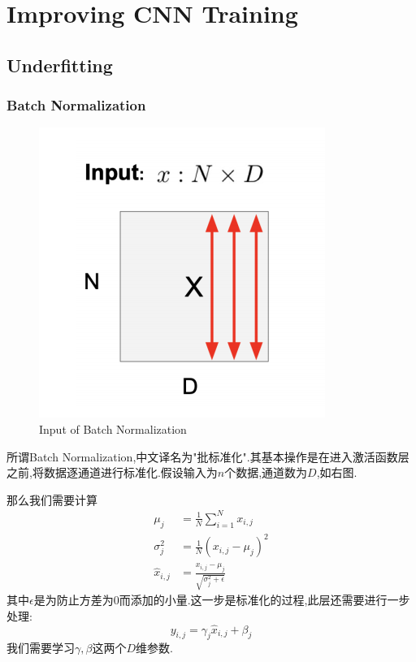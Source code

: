 \section{Improving CNN Training}
\subsection{Underfitting}

\subsubsection{Batch Normalization}



\begin{figure}%
	
	\includegraphics[scale=0.65]{figures/BNsize.png}
	\caption{Input of Batch Normalization}
	\label{Input of Batch Normalization}
	
\end{figure}

所谓Batch Normalization,中文译名为"批标准化".其基本操作是在进入激活函数层之前,将数据逐通道进行标准化.假设输入为$n$个数据,通道数为$D$,如右图.

那么我们需要计算
\begin{equation}
	\begin{split}
		\mu_j &= \frac{1}{N} \sum_{i=1}^{N} x_{i, j}
		\\
		\sigma_j^2 &= \frac{1}{N} (x_{i, j} - \mu_j)^2
		\\
		\hat{x}_{i, j} &= \frac{x_{i, j} - \mu_j}{\sqrt{\sigma_j^2 + \epsilon}}
	\end{split}
	\label{BN calculation}
\end{equation}
其中$\epsilon$是为防止方差为$0$而添加的小量.这一步是标准化的过程,此层还需要进行一步处理:
\begin{equation}
	y_{i, j} = \gamma_{j} \hat{x}_{i,j} + \beta_j
\end{equation}
我们需要学习$\gamma, \beta$这两个$D$维参数.

